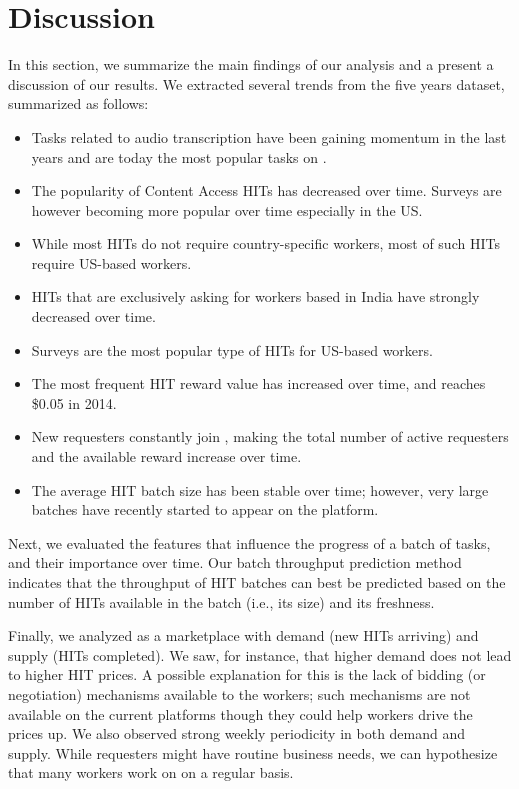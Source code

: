 \section{Discussion}
\label{sec:discuss}

In this section, we summarize the main findings of our analysis and a present a discussion of our results. We  extracted several trends from the five years dataset, summarized as follows:
\begin{itemize}[noitemsep,topsep=0pt,parsep=0pt,partopsep=0pt]
	\item Tasks related to audio transcription have been gaining momentum in the last years and are today the most popular tasks on \amt{}.
	\item The popularity of Content Access HITs has decreased over time. Surveys are however becoming more popular over time especially in the US.
	\item While most HITs do not require country-specific workers, most of such HITs require US-based workers.
	\item HITs that are exclusively asking for workers based in India have strongly decreased over time.
	\item Surveys are the most popular type of HITs for US-based workers.
	\item The most frequent HIT reward value has increased over time, and reaches \$0.05 in 2014.
	\item New requesters constantly join \amt{}, making the total number of active requesters and the available reward increase over time.
	\item The average HIT batch size has been stable over time; however, very large batches have recently started to appear on the platform.
\end{itemize}

Next, we evaluated the features that influence the progress of a batch of tasks, and their importance over time. Our batch throughput prediction method indicates that the throughput of HIT batches can best be predicted based on the number of HITs available in the batch (i.e., its size) and its freshness.

Finally, we analyzed \amt{} as a marketplace with demand (new HITs arriving) and supply (HITs completed). We saw, for instance, that higher demand does not lead to higher HIT prices. A possible explanation for this is the lack of bidding (or negotiation) mechanisms available to the workers; such mechanisms are not available on the current platforms though they could help workers drive the prices up. We also observed strong weekly periodicity in both demand and supply. While requesters might have routine business needs, we can hypothesize that many workers work on \amt{} on a regular basis.